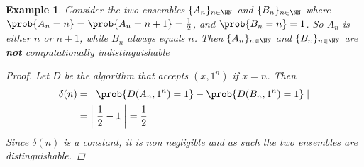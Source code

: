 \documentclass{article}
\newtheorem{example}{Example}
\begin{document}
\begin{example}
Consider the two ensembles $\{A_n\}_{n \in \NN}$ and $\{B_n\}_{n \in \NN}$ where $\prob{A_n = n} = \prob{A_n = n+1} = \frac{1}{2}$, and $\prob{B_n = n} = 1$. So $A_n$ is either $n$ or $n+1$, while $B_n$ always equals $n$. Then $\{A_n\}_{n \in \NN}$ and $\{B_n\}_{n \in \NN}$ are \textbf{not} computationally indistinguishable
\begin{proof}
Let $D$ be the algorithm that accepts $(x, 1^n)$ if $x = n$. Then 
\begin{align*}
    \delta(n) &= \left| \; \prob{D(A_n, 1^n) = 1} - \prob{D(B_n, 1^n) = 1} \;  \right| \\
    &= \left| \; \frac{1}{2} - 1 \;  \right| = \frac{1}{2} 
\end{align*}
Since $\delta(n)$ is a constant, it is non negligible and as such the two ensembles are distinguishable. 
\end{proof}
\end{example}
\end{document}
